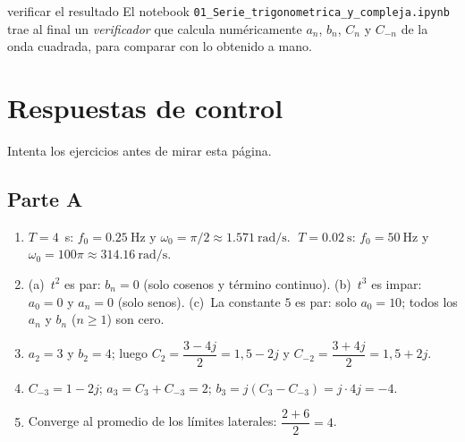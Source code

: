 \documentclass[11pt,a4paper]{article}
\begin{document}
\begin{notatec}{verificar el resultado}
El notebook \texttt{01\_Serie\_trigonometrica\_y\_compleja.ipynb} trae al final un
\emph{verificador} que calcula numéricamente $a_n$, $b_n$, $C_n$ y $C_{-n}$ de la onda
cuadrada, para comparar con lo obtenido a mano.
\end{notatec}

\newpage
\section*{Respuestas de control}
Intenta los ejercicios antes de mirar esta página.
\small\setlength{\abovedisplayskip}{3pt}\setlength{\belowdisplayskip}{3pt}

\subsection*{Parte A}
\begin{enumerate}
    \item $T=4$~s: $f_0=\qty{0.25}{\hertz}$ y $\omega_0=\pi/2\approx\qty{1.571}{\radian\per\second}$.
          $\;T=\qty{0.02}{\second}$: $f_0=\qty{50}{\hertz}$ y
          $\omega_0=100\pi\approx\qty{314.16}{\radian\per\second}$.
    \item (a)~$t^{2}$ es par: $b_n=0$ (solo cosenos y término continuo).
          (b)~$t^{3}$ es impar: $a_0=0$ y $a_n=0$ (solo senos).
          (c)~La constante $5$ es par: solo $a_0=10$; todos los $a_n$ y $b_n$ ($n\ge1$) son cero.
    \item $a_2=3$ y $b_2=4$; luego $C_2=\dfrac{3-4j}{2}=1{,}5-2j$ y
          $C_{-2}=\dfrac{3+4j}{2}=1{,}5+2j$.
    \item $C_{-3}=1-2j$; $a_3=C_3+C_{-3}=2$; $b_3=j(C_3-C_{-3})=j\cdot4j=-4$.
    \item Converge al promedio de los límites laterales: $\dfrac{2+6}{2}=4$.
\end{enumerate}
\end{document}
